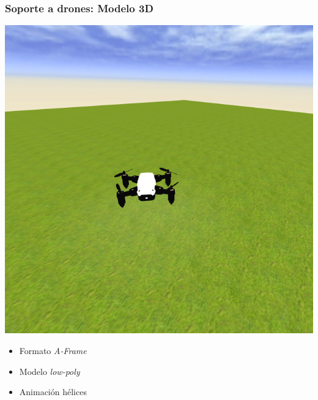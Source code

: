 \documentclass[xcolor={table}]{beamer}
\begin{document}
    	\begin{frame}
			\frametitle{Soporte a drones: Modelo 3D}
      \begin{minipage}{.48\textwidth}
      \includegraphics[scale=0.25]{img/WebsimDrone.png}
        \end{minipage}
      \begin{minipage}{.50\textwidth}
      \begin{itemize}
      \begin{itemize}{}\itemsep5pt
          \item Formato \textit{A-Frame}
          \item Modelo \textit{low-poly}
          \item Animación hélices
          \end{itemize}
      \end{itemize}
    \end{minipage}
    	\end{frame}
\end{document}
